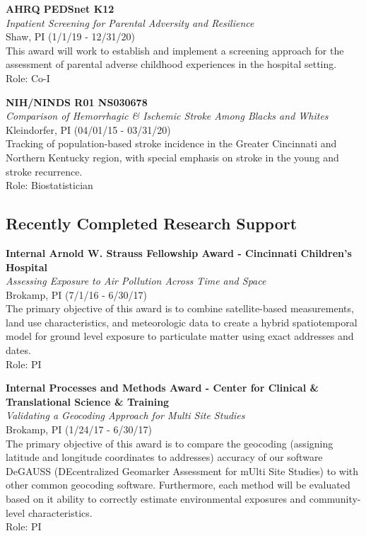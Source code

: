 \documentclass{nihbiosketch}
\begin{document}
\bigskip

\textbf{AHRQ PEDSnet K12}\\
\emph{Inpatient Screening for Parental Adversity and Resilience}\\
Shaw, PI (1/1/19 - 12/31/20)\\
This award will work to establish and implement a screening approach for
the assessment of parental adverse childhood experiences in the hospital
setting.\\
Role: Co-I

\bigskip

\textbf{NIH/NINDS R01 NS030678}\\
\emph{Comparison of Hemorrhagic \& Ischemic Stroke Among Blacks and
Whites}\\
Kleindorfer, PI (04/01/15 - 03/31/20)\\
Tracking of population-based stroke incidence in the Greater Cincinnati
and Northern Kentucky region, with special emphasis on stroke in the
young and stroke recurrence.\\
Role: Biostatistician

\bigskip

\subsection*{Recently Completed Research Support}

\bigskip

\textbf{Internal Arnold W. Strauss Fellowship Award - Cincinnati
Children's Hospital}\\
\emph{Assessing Exposure to Air Pollution Across Time and Space}\\
Brokamp, PI (7/1/16 - 6/30/17)\\
The primary objective of this award is to combine satellite-based
measurements, land use characteristics, and meteorologic data to create
a hybrid spatiotemporal model for ground level exposure to particulate
matter using exact addresses and dates.\\
Role: PI

\bigskip

\textbf{Internal Processes and Methods Award - Center for Clinical \&
Translational Science \& Training}\\
\emph{Validating a Geocoding Approach for Multi Site Studies}\\
Brokamp, PI (1/24/17 - 6/30/17)\\
The primary objective of this award is to compare the geocoding
(assigning latitude and longitude coordinates to addresses) accuracy of
our software DeGAUSS (DEcentralized Geomarker Assessment for mUlti Site
Studies) to with other common geocoding software. Furthermore, each
method will be evaluated based on it ability to correctly estimate
environmental exposures and community-level characteristics.\\
Role: PI

\bigskip
\end{document}
